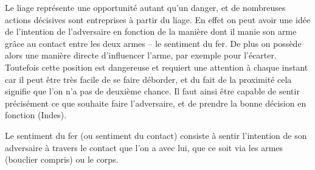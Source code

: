 Le liage représente une opportunité autant qu'un danger, et de nombreuses actions décisives sont entreprises à partir du liage.
En effet on peut avoir une idée de l'intention de l'adversaire en fonction de la manière dont il manie son arme grâce au contact entre les deux armes -- le sentiment du fer.
De plus on possède alors une manière directe d'influencer l'arme, par exemple pour l'écarter.
Toutefois cette position est dangereuse et requiert une attention à chaque instant car il peut être très facile de se faire déborder, et du fait de la proximité cela signifie que l'on n'a pas de deuxième chance.
Il faut ainsi être capable de sentir précisément ce que souhaite faire l'adversaire, et de prendre la bonne décision en fonction (Indes).


\begin{definition}
\label{conc:def:sentiment-fer}

Le sentiment du fer (ou sentiment du contact) consiste à sentir l'intention de son adversaire à travers le contact que l'on a avec lui, que ce soit via les armes (bouclier compris) ou le corps.
\end{definition}


